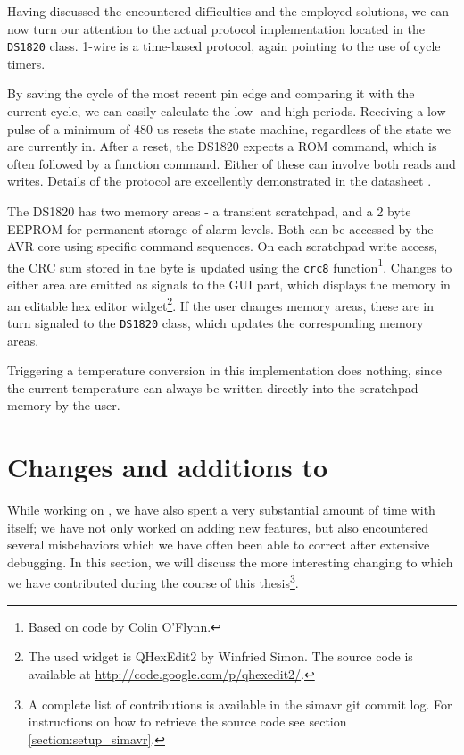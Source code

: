 Having discussed the encountered difficulties and the employed solutions, we
can now turn our attention to the actual protocol implementation located in the
\lstinline|DS1820| class. 1-wire is a time-based protocol, again pointing to the
use of cycle timers.

By saving the cycle of the most recent pin edge and comparing
it with the current cycle, we can easily calculate the low- and high periods.
Receiving a low pulse of a minimum of 480 \ac{us} resets the state machine,
regardless of the state we are currently in. After a reset, the DS1820
expects a ROM command, which is often followed by a function command. Either of
these can involve both reads and writes. Details of the protocol are excellently
demonstrated in the datasheet \cite{maxim02}.

The DS1820 has two memory areas - a transient scratchpad, and a 2 byte \ac{EEPROM}
for permanent storage of alarm levels. Both can be accessed by the \ac{AVR} core
using specific command sequences. On each scratchpad write access, the \ac{CRC}
sum stored in the  byte is updated using the \lstinline|crc8| function\footnote{
%
Based on code by Colin O'Flynn.
%
}. Changes to either area are emitted as signals to the \ac{GUI} part, which
displays the memory in an editable hex editor widget\footnote{
%
The used widget is QHexEdit2 by Winfried Simon. The source code is available
at \url{http://code.google.com/p/qhexedit2/}.
%
}. If the user changes memory areas, these are in turn signaled to the
\lstinline|DS1820| class, which updates the corresponding memory areas.

Triggering a temperature conversion in this implementation does nothing, since the
current temperature can always be written directly into the scratchpad memory by the user.

\section{Changes and additions to \simavr}

While working on \qsimavr, we have also spent a very substantial amount of time
with \simavr itself; we have not only worked on adding new features, but also encountered
several misbehaviors which we have often been able to correct after extensive debugging.
In this section, we will discuss the more interesting changing to \simavr which
we have contributed during the course of this thesis\footnote{
%
A complete list of contributions is available in the simavr git commit log. For
instructions on how to retrieve the source code see section \ref{section:setup_simavr}.
%
}.

